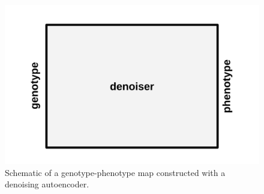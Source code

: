 \begin{figure}
  \includegraphics[width=\linewidth]{img/denoiser_map}
  \caption{
    Schematic of a genotype-phenotype map constructed with a denoising autoencoder.
  }\label{fig:denoiser_map}
\end{figure}
